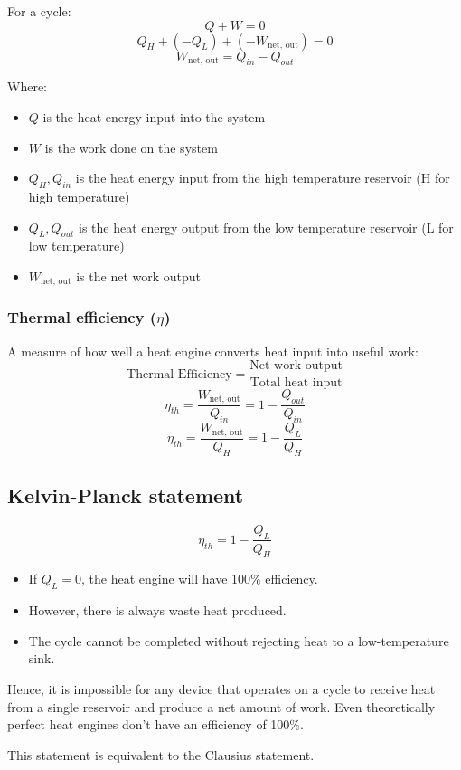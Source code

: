\documentclass[11pt]{article}
\begin{document}
For a cycle:
\[Q + W = 0\]
\[Q_H + (-Q_L) + (-W_{\text{net, out}}) = 0\]
\[W_{\text{net, out}} = Q_{in} - Q_{out}\]

Where:
\begin{itemize}
\item \(Q\) is the heat energy input into the system
\item \(W\) is the work done on the system
\item \(Q_H, Q_{in}\) is the heat energy input from the high temperature reservoir (H for high temperature)
\item \(Q_L, Q_{out}\) is the heat energy output from the low temperature reservoir (L for low temperature)
\item \(W_{\text{net, out}}\) is the net work output
\end{itemize}

\subsubsection{Thermal efficiency (\(\eta\))}
\label{sec:org8e5519a}
A measure of how well a heat engine converts heat input into useful work:
\[\text{Thermal Efficiency} = \frac{\text{Net work output}}{\text{Total heat input}}\]
\[\eta_{th} = \frac{W_{\text{net, out}}}{Q_{in}} = 1 - \frac{Q_{out}}{Q_{in}}\]
\[\eta_{th} = \frac{W_{\text{net, out}}}{Q_{H}} = 1 - \frac{Q_L}{Q_H}\]

 \newpage

\subsection{Kelvin-Planck statement}
\label{sec:org8e74979}
\[\eta_{th} = 1 - \frac{Q_L}{Q_H}\]
\begin{itemize}
\item If \(Q_L = 0\), the heat engine will have 100\% efficiency.
\item However, there is always waste heat produced.
\item The cycle cannot be completed without rejecting heat to a low-temperature sink.
\end{itemize}

Hence, it is impossible for any device that operates on a cycle to receive heat from a single reservoir and produce a net amount of work. Even theoretically perfect heat engines don't have an efficiency of 100\%.

This statement is equivalent to the Clausius statement.

 \newpage
\end{document}
